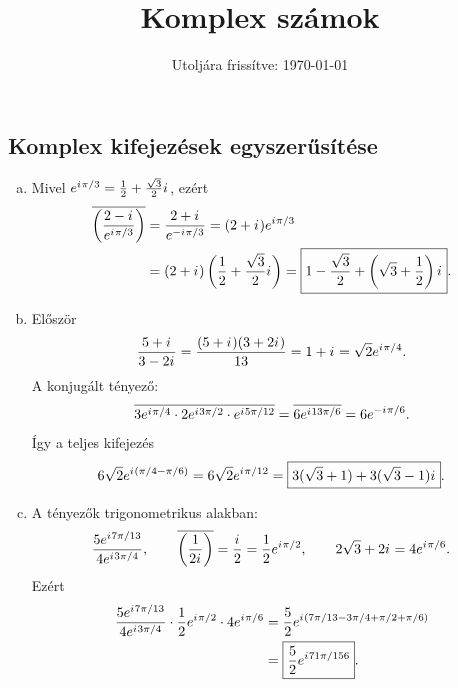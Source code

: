 \documentclass{szb-solution}
\title{Komplex számok}
\date{Utoljára frissítve: \today}
\begin{document}
\maketitle

\subsection{Komplex kifejezések egyszerűsítése}

\begin{enumerate}[a)]
  \item Mivel $e^{{i\mkern1mu}\pi/3}=\frac12+\frac{\sqrt3}{2}{i\mkern1mu}$, ezért
        \begin{align*}
          \overline{\left(\frac{2-{i\mkern1mu}}{e^{{i\mkern1mu}\pi/3}}\right)}
          &=\frac{2+{i\mkern1mu}}{e^{-{i\mkern1mu}\pi/3}}
          =(2+{i\mkern1mu})e^{{i\mkern1mu}\pi/3}
          \\
          &=(2+{i\mkern1mu})\left(\frac12+\frac{\sqrt3}{2}{i\mkern1mu}\right)
          =\boxed{1-\frac{\sqrt3}{2}
          +\left(\sqrt3+\frac12\right){i\mkern1mu}}
          \text.
        \end{align*}

  \item Először
        $$
          \frac{5+{i\mkern1mu}}{3-2{i\mkern1mu}}
          =\frac{(5+{i\mkern1mu})(3+2{i\mkern1mu})}{13}
          =1+{i\mkern1mu}
          =\sqrt2e^{{i\mkern1mu}\pi/4}
          \text.
        $$
        A konjugált tényező:
        $$
          \overline{
            3e^{{i\mkern1mu}\pi/4}\cdot2e^{{i\mkern1mu}3\pi/2}\cdot e^{{i\mkern1mu}5\pi/12}
          }
          =\overline{6e^{{i\mkern1mu}13\pi/6}}
          =6e^{-{i\mkern1mu}\pi/6}
          \text.
        $$
        Így a teljes kifejezés
        $$
          6\sqrt2e^{{i\mkern1mu}(\pi/4-\pi/6)}
          =6\sqrt2e^{{i\mkern1mu}\pi/12}
          =\boxed{3(\sqrt3+1)+3(\sqrt3-1){i\mkern1mu}}
          \text.
        $$

  \item A tényezők trigonometrikus alakban:
        $$
          \frac{5e^{{i\mkern1mu}7\pi/13}}{4e^{{i\mkern1mu}3\pi/4}},
          \qquad
          \overline{\left(\frac{1}{2{i\mkern1mu}}\right)}=\frac{{i\mkern1mu}}{2}
          =\frac12e^{{i\mkern1mu}\pi/2},
          \qquad
          2\sqrt3+2{i\mkern1mu}=4e^{{i\mkern1mu}\pi/6}
          \text.
        $$
        Ezért
        \begin{align*}
          \frac{5e^{{i\mkern1mu}7\pi/13}}{4e^{{i\mkern1mu}3\pi/4}}
          \cdot\frac12e^{{i\mkern1mu}\pi/2}\cdot4e^{{i\mkern1mu}\pi/6}
          &=\frac52e^{{i\mkern1mu}(7\pi/13-3\pi/4+\pi/2+\pi/6)}
          \\
          &=\boxed{\frac52e^{{i\mkern1mu}71\pi/156}}
          \text.
        \end{align*}
\end{enumerate}
\end{document}

